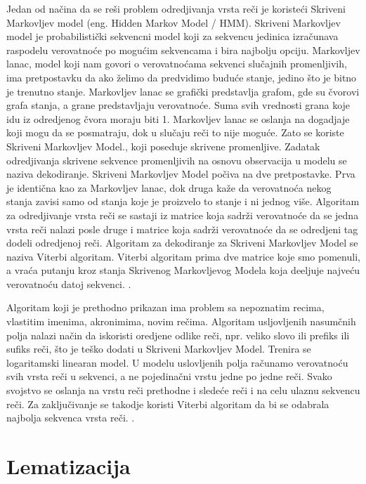 \documentclass[12pt,oneside]{memoir}
\begin{document}
Jedan od načina da se reši problem odredjivanja vrsta reči je koristeći Skriveni Markovljev model (eng. Hidden Markov Model / HMM). Skriveni Markovljev model je probabilistički sekvencni model koji za sekvencu jedinica izračunava raspodelu verovatnoće po mogućim sekvencama i bira najbolju opciju.  Markovljev lanac,  model koji nam govori o verovatnoćama sekvenci slučajnih promenljivih,  ima pretpostavku da ako želimo da predvidimo buduće stanje,  jedino što je bitno je trenutno stanje.  Markovljev lanac se grafički predstavlja grafom, gde su čvorovi grafa stanja, a grane predstavljaju verovatnoće.  Suma svih vrednosti grana koje idu iz odredjenog čvora moraju biti 1.  Markovljev lanac se oslanja na dogadjaje koji mogu da se posmatraju,  dok u slučaju reči to nije moguće.  Zato se koriste Skriveni Markovljev Model., koji poseduje skrivene promenljive.  Zadatak odredjivanja skrivene sekvence promenljivih na osnovu observacija u modelu se naziva dekodiranje.  Skriveni Markovljev Model počiva na dve pretpostavke.  Prva je identična kao za Markovljev lanac, dok druga kaže da verovatnoća nekog stanja zavisi samo od stanja koje je proizvelo to stanje i ni jednog više.  Algoritam za odredjivanje vrsta reči se sastaji iz matrice koja sadrži verovatnoće da se jedna vrsta reči nalazi posle druge i matrice koja sadrži verovatnoće da se odredjeni tag dodeli odredjenoj reči.  Algoritam za dekodiranje za Skriveni Markovljev Model se naziva Viterbi algoritam.  Viterbi algoritam prima dve matrice koje smo pomenuli, a vraća putanju kroz stanja Skrivenog Markovljevog Modela koja deeljuje najveću verovatnoću datoj sekvenci.  \cite{pos_tagging}.

Algoritam koji je prethodno prikazan ima problem sa nepoznatim recima,  vlastitim imenima,  akronimima,  novim rečima.  Algoritam usljovljenih nasumčnih polja nalazi način da iskoristi oredjene odlike reči,  npr. veliko slovo ili prefiks ili sufiks reči,  što je teško dodati u Skriveni Markovljev Model.  Trenira se logaritamski linearan model.  U modelu uslovljenih polja računamo verovatnoću svih vrsta reči u sekvenci,  a ne pojedinačni vrstu jedne po jedne reči.  Svako svojstvo se oslanja na vrstu reči prethodne i sledeće reči i na celu ulaznu sekvencu reči.  Za zaključivanje se takodje koristi Viterbi algoritam da bi se odabrala najbolja sekvenca vrsta reči.  \cite{pos_tagging}.

\section{Lematizacija}
\end{document}
